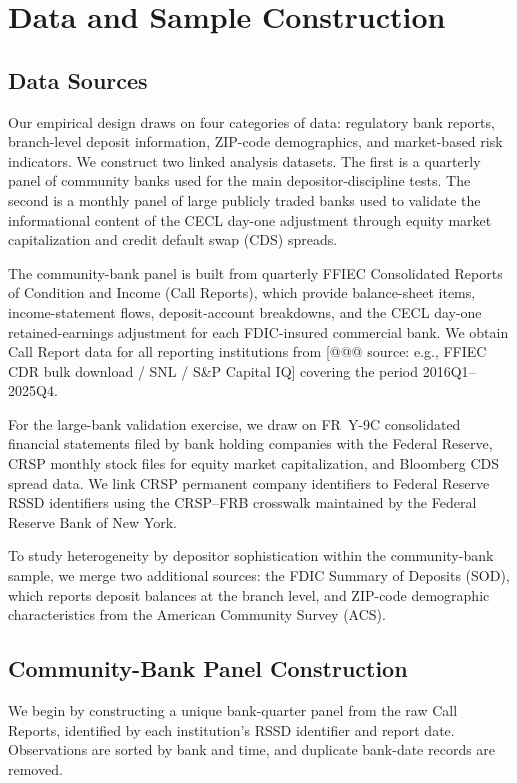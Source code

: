 \section{Data and Sample Construction}\label{sec:data}

\subsection{Data Sources}

Our empirical design draws on four categories of data: regulatory bank reports, branch-level deposit information, ZIP-code demographics, and market-based risk indicators. We construct two linked analysis datasets. The first is a quarterly panel of community banks used for the main depositor-discipline tests. The second is a monthly panel of large publicly traded banks used to validate the informational content of the CECL day-one adjustment through equity market capitalization and credit default swap (CDS) spreads.

The community-bank panel is built from quarterly FFIEC Consolidated Reports of Condition and Income (Call Reports), which provide balance-sheet items, income-statement flows, deposit-account breakdowns, and the CECL day-one retained-earnings adjustment for each FDIC-insured commercial bank. We obtain Call Report data for all reporting institutions from [@@@ source: e.g., FFIEC CDR bulk download / SNL / S\&P Capital IQ] covering the period 2016Q1--2025Q4.

For the large-bank validation exercise, we draw on FR~Y-9C consolidated financial statements filed by bank holding companies with the Federal Reserve, CRSP monthly stock files for equity market capitalization, and Bloomberg CDS spread data. We link CRSP permanent company identifiers to Federal Reserve RSSD identifiers using the CRSP--FRB crosswalk maintained by the Federal Reserve Bank of New York.

To study heterogeneity by depositor sophistication within the community-bank sample, we merge two additional sources: the FDIC Summary of Deposits (SOD), which reports deposit balances at the branch level, and ZIP-code demographic characteristics from the American Community Survey (ACS).

\subsection{Community-Bank Panel Construction}

We begin by constructing a unique bank-quarter panel from the raw Call Reports, identified by each institution's RSSD identifier and report date. Observations are sorted by bank and time, and duplicate bank-date records are removed.

